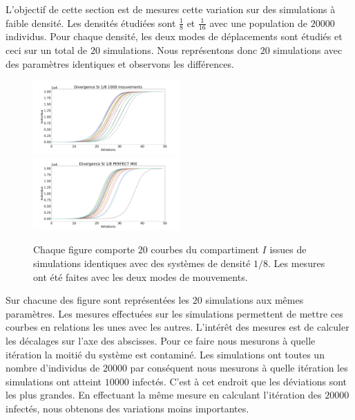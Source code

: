 L'objectif de cette section est de mesures cette variation sur des simulations à faible densité. Les densités étudiées sont $\frac{1}{8}$ et $\frac{1}{16}$ avec une population de $20000$ individus. Pour chaque densité, les deux modes de déplacements sont étudiés et ceci sur un total de $20$ simulations. Nous représentons donc $20$ simulations avec des paramètres identiques et observons les différences.

\newpage

\begin{figure}
	\centering
	\captionsetup{justification=centering}
	\includegraphics[width=0.5\textwidth]{Images/SI_divergence_8_1000.pdf}
	\includegraphics[width=0.5\textwidth]{Images/SI_divergence_8_mix.pdf}
	\caption[Variations aléatoires : SI]{Chaque figure comporte $20$ courbes du compartiment $I$ issues de simulations identiques avec des systèmes de densité $1/8$. Les mesures ont été faites avec les deux modes de mouvements.}
\end{figure}

Sur chacune des figure sont représentées les $20$ simulations aux mêmes paramètres. Les mesures effectuées sur les simulations permettent de mettre ces courbes en relations les unes avec les autres. L'intérêt des mesures est de calculer les décalages sur l'axe des abscisses. Pour ce faire nous mesurons à quelle itération la moitié du système est contaminé. Les simulations ont toutes un nombre d'individus de $20000$ par conséquent nous mesurons à quelle itération les simulations ont atteint $10000$ infectés. C'est à cet endroit que les déviations sont les plus grandes. En effectuant la même mesure en calculant l'itération des $20000$ infectés, nous obtenons des variations moins importantes.\\

